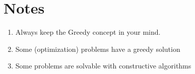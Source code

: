 \documentclass[12pt]{book}
\begin{document}
\section{Notes}
\begin{enumerate}[label = \roman*.]
\item Always keep the Greedy concept in your mind.
\item Some (optimization) problems have a greedy solution
\item Some problems are solvable with constructive algorithms
\end{enumerate}
\end{document}
